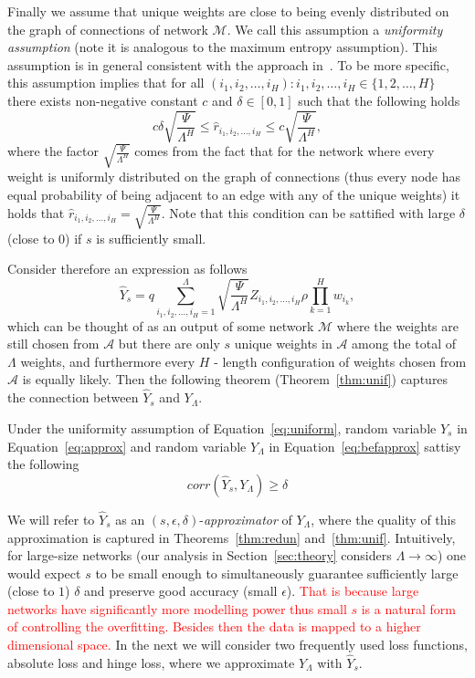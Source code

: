 \documentclass[twoside]{article}
\begin{document}
Finally we assume that unique weights are close to being evenly distributed on the graph of connections of network $\mathcal{M}$. We call this assumption a \textit{uniformity assumption} (note it is analogous to the maximum entropy assumption). This assumption is in general consistent with the approach in~\cite{NIPS2013_5025}. To be more specific, this assumption implies that for all $(i_1,i_2,\dots,i_H):i_1,i_2,\dots,i_H \in \{1,2,\dots,H\}$ there exists non-negative constant $c$ and $\delta \in [0,1]$ such that the following holds
\begin{equation}
c\delta\sqrt{\frac{\Psi}{\Lambda^H}} \leq \hat{r}_{i_1,i_2,\dots,i_H} \leq c\sqrt{\frac{\Psi}{\Lambda^H}},
\label{eq:uniform}
\end{equation}
where the factor $\sqrt{\frac{\Psi}{\Lambda^H}}$ comes from the fact that for the network where every weight is uniformly distributed on the graph of connections (thus every node has equal probability of being adjacent to an edge with any of the unique weights) it holds that $\hat{r}_{i_1,i_2,\dots,i_H} = \sqrt{\frac{\Psi}{\Lambda^H}}$. Note that this condition can be sattified with large $\delta$ (close to $0$) if $s$ is sufficiently small.

Consider therefore an expression as follows
\begin{equation}
\hat{Y}_s = q\sum_{i_1,i_2,\dots,i_H=1}^{\Lambda}\sqrt{\frac{\Psi}{\Lambda^H}}Z_{i_1,i_2,\dots,i_H}\rho\prod_{k = 1}^{H}w_{i_k},
\label{eq:approx}
\end{equation}
which can be thought of as an output of some network $\mathcal{M}$ where the weights are still chosen from $\mathcal{A}$ but there are only $s$ unique weights in $\mathcal{A}$ among the total of $\Lambda$ weights, and furthermore every $H$ - length configuration of weights chosen from $\mathcal{A}$ is equally likely. Then the following theorem (Theorem~\ref{thm:unif}) captures the connection between $\hat{Y}_s$ and $Y_{\Lambda}$.

\begin{theorem}
Under the uniformity assumption of Equation~\ref{eq:uniform}, random variable $\hat{Y}_s$ in Equation~\ref{eq:approx} and random variable $Y_{\Lambda}$ in Equation~\ref{eq:befapprox} sattisy the following
\[corr(\hat{Y}_s,Y_{\Lambda}) \geq \delta
\]
\label{thm:unif}
\end{theorem}

We will refer to $\hat{Y}_s$ as an $(s,\epsilon,\delta)$-\textit{approximator} of $Y_{\Lambda}$, where the quality of this approximation is captured in Theorems~\ref{thm:redun} and~\ref{thm:unif}. Intuitively, for large-size networks (our analysis in Section~\ref{sec:theory} considers $\Lambda \rightarrow \infty$) one would expect $s$ to be small enough to simultaneously guarantee sufficiently large (close to $1$) $\delta$ and preserve good accuracy (small $\epsilon$). \textcolor{red}{That is because large networks have significantly more modelling power thus small $s$ is a natural form of controlling the overfitting. Besides then the data is mapped to a higher dimensional space.} In the next we will consider two frequently used loss functions, absolute loss and hinge loss, where we approximate $Y_{\Lambda}$ with $\hat{Y}_s$. 
\end{document}
